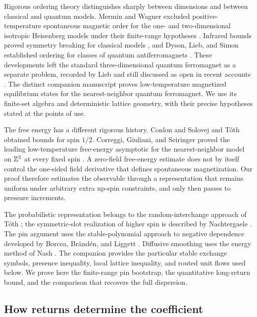 Rigorous ordering theory distinguishes sharply between dimensions and
between classical and quantum models. Mermin and Wagner excluded
positive-temperature spontaneous magnetic order for the one- and
two-dimensional isotropic Heisenberg models under their finite-range
hypotheses \cite{MerminWagner1966}. Infrared bounds proved symmetry
breaking for classical models \cite{FSS1976}, and Dyson, Lieb, and Simon
established ordering for classes of quantum antiferromagnets
\cite{DLS1978}. These developments left the standard three-dimensional
quantum ferromagnet as a separate problem, recorded by Lieb
\cite{Lieb1999} and still discussed as open in recent accounts
\cite{Seiringer2025,BjornbergRyan2026}. The distinct companion manuscript
\cite[Theorem~1.1]{Ordering} proves low-temperature magnetized equilibrium states
for the nearest-neighbor quantum ferromagnet. We use its finite-set
algebra and deterministic lattice geometry, with their precise
hypotheses stated at the points of use.

The free energy has a different rigorous history. Conlon and Solovej
\cite{ConlonSolovej1991} and T\'oth \cite{Toth1993} obtained bounds for
spin $1/2$. Correggi, Giuliani, and Seiringer proved the leading
low-temperature free-energy asymptotic for the nearest-neighbor model
on $\mathbb Z^3$ at every fixed spin \cite[Theorem~2.1]{CGS2015}. A zero-field free-energy estimate
does not by itself control the one-sided field derivative that defines
spontaneous magnetization. Our proof therefore estimates the observable
through a representation that remains uniform under arbitrary extra
up-spin constraints, and only then passes to pressure increments.

The probabilistic representation belongs to the random-interchange
approach of T\'oth \cite{Toth1993}; the symmetric-slot realization of
higher spin is described by Nachtergaele \cite{Nachtergaele1994}.
The pin argument uses the stable-polynomial approach to negative
dependence developed by Borcea, Br\"and\'en, and Liggett \cite{BBL2009}. Diffusive smoothing uses the
energy method of Nash \cite{Nash1958}. The companion \cite{Ordering}
provides the particular stable exchange symbols, presence inequality,
local lattice inequality, and routed unit flows used below. We prove
here the finite-range pin bootstrap, the quantitative long-return
bound, and the comparison that recovers the full dispersion.

\subsection{How returns determine the coefficient}

